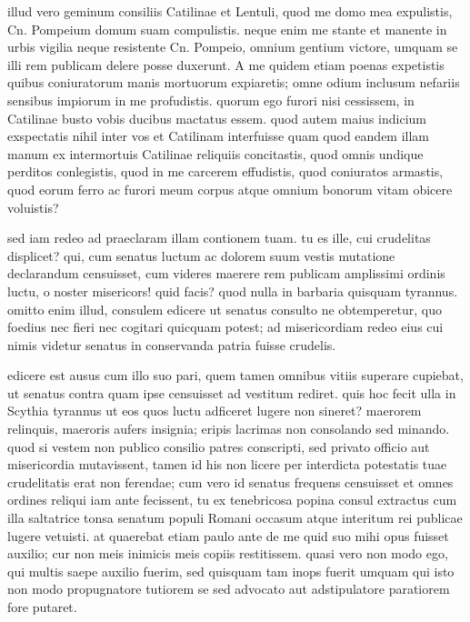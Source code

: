  illud vero geminum consiliis Catilinae et Lentuli, quod me domo mea expulistis, Cn. Pompeium domum suam compulistis. neque enim me stante et manente in urbis vigilia neque resistente Cn. Pompeio, omnium gentium victore, umquam se illi rem publicam delere posse duxerunt. A me quidem etiam poenas expetistis quibus coniuratorum manis mortuorum expiaretis; omne odium inclusum nefariis sensibus impiorum in me profudistis. quorum ego furori nisi cessissem, in Catilinae busto vobis ducibus mactatus essem. quod autem maius indicium exspectatis nihil inter vos et Catilinam interfuisse quam quod eandem illam manum ex intermortuis Catilinae reliquiis concitastis, quod omnis undique perditos conlegistis, quod in me carcerem effudistis, quod coniuratos armastis, quod eorum ferro ac furori meum corpus atque omnium bonorum vitam obicere voluistis?

 sed iam redeo ad praeclaram illam contionem tuam. tu es ille, cui crudelitas displicet? qui, cum senatus luctum ac dolorem suum vestis mutatione declarandum censuisset, cum videres maerere rem publicam amplissimi ordinis luctu, o noster misericors! quid facis? quod nulla in barbaria quisquam tyrannus. omitto enim illud, consulem edicere ut senatus consulto ne obtemperetur, quo foedius nec fieri nec cogitari quicquam potest; ad misericordiam redeo eius cui nimis videtur senatus in conservanda patria fuisse crudelis.

 edicere est ausus cum illo suo pari, quem tamen omnibus vitiis superare cupiebat, ut senatus contra quam ipse censuisset ad vestitum rediret. quis hoc fecit ulla in Scythia tyrannus ut eos quos luctu adficeret lugere non sineret? maerorem relinquis, maeroris aufers insignia; eripis lacrimas non consolando sed minando. quod si vestem non publico consilio patres conscripti, sed privato officio aut misericordia mutavissent, tamen id his non licere per interdicta potestatis tuae crudelitatis erat non ferendae; cum vero id senatus frequens censuisset et omnes ordines reliqui iam ante fecissent, tu ex tenebricosa popina consul extractus cum illa saltatrice tonsa senatum populi Romani occasum atque interitum rei publicae lugere vetuisti. at quaerebat etiam paulo ante de me quid suo mihi opus fuisset auxilio; cur non meis inimicis meis copiis restitissem. quasi vero non modo ego, qui multis saepe auxilio fuerim, sed quisquam tam inops fuerit umquam qui isto non modo propugnatore tutiorem se sed advocato aut adstipulatore paratiorem fore putaret.

